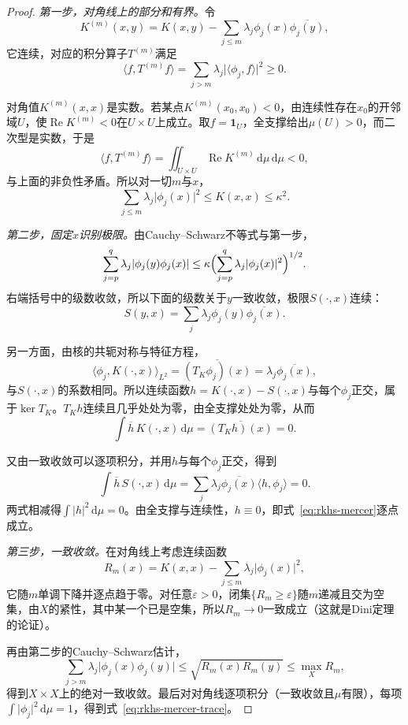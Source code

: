 \begin{proof}
\emph{第一步，对角线上的部分和有界。}令
\[
K^{(m)}(x,y)=K(x,y)-\sum_{j\leq m}\lambda_j\phi_j(x)\overline{\phi_j(y)} ,
\]
它连续，对应的积分算子$T^{(m)}$满足
\[
\langle f,T^{(m)}f\rangle=\sum_{j>m}\lambda_j\lvert\langle\phi_j,f\rangle\rvert^2\geq0 .
\]

对角值$K^{(m)}(x,x)$是实数。若某点$K^{(m)}(x_0,x_0)<0$，由连续性存在$x_0$的开邻域$U$，使$\operatorname{Re}K^{(m)}<0$在$U\times U$上成立。取$f=\mathbf 1_U$，全支撑给出$\mu(U)>0$，而二次型是实数，于是
\[
\langle f,T^{(m)}f\rangle=\iint_{U\times U}\operatorname{Re}K^{(m)}\,\mathrm d\mu\,\mathrm d\mu<0 ,
\]
与上面的非负性矛盾。所以对一切$m$与$x$，
\[
\sum_{j\leq m}\lambda_j\lvert\phi_j(x)\rvert^2\leq K(x,x)\leq\kappa^2 .
\]

\emph{第二步，固定$x$识别极限。}由Cauchy--Schwarz不等式与第一步，
\[
\sum_{j=p}^q\lambda_j\lvert\phi_j(y)\phi_j(x)\rvert\leq\kappa\Bigl(\sum_{j=p}^q\lambda_j\lvert\phi_j(x)\rvert^2\Bigr)^{1/2} .
\]
右端括号中的级数收敛，所以下面的级数关于$y$一致收敛，极限$S(\cdot,x)$连续：
\[
S(y,x)=\sum_j\lambda_j\phi_j(y)\overline{\phi_j(x)} .
\]

另一方面，由核的共轭对称与特征方程，
\[
\langle\phi_j,K(\cdot,x)\rangle_{L^2}=\overline{(T_K\phi_j)(x)}=\lambda_j\overline{\phi_j(x)} ,
\]
与$S(\cdot,x)$的系数相同。所以连续函数$h=K(\cdot,x)-S(\cdot,x)$与每个$\phi_j$正交，属于$\ker T_K$。$T_Kh$连续且几乎处处为零，由全支撑处处为零，从而
\[
\int\overline h\,K(\cdot,x)\,\mathrm d\mu=\overline{(T_Kh)(x)}=0 .
\]

又由一致收敛可以逐项积分，并用$h$与每个$\phi_j$正交，得到
\[
\int\overline h\,S(\cdot,x)\,\mathrm d\mu=\sum_j\lambda_j\overline{\phi_j(x)}\langle h,\phi_j\rangle=0 .
\]
两式相减得$\int\lvert h\rvert^2\,\mathrm d\mu=0$。由全支撑与连续性，$h\equiv0$，即式~\eqref{eq:rkhs-mercer}逐点成立。

\emph{第三步，一致收敛。}在对角线上考虑连续函数
\[
R_m(x)=K(x,x)-\sum_{j\leq m}\lambda_j\lvert\phi_j(x)\rvert^2 ,
\]
它随$m$单调下降并逐点趋于零。对任意$\varepsilon>0$，闭集$\{R_m\geq\varepsilon\}$随$m$递减且交为空集，由$X$的紧性，其中某一个已是空集，所以$R_m\to0$一致成立（这就是Dini定理的论证）。

再由第二步的Cauchy--Schwarz估计，
\[
\sum_{j>m}\lambda_j\lvert\phi_j(x)\phi_j(y)\rvert\leq\sqrt{R_m(x)R_m(y)}\leq\max_XR_m ,
\]
得到$X\times X$上的绝对一致收敛。最后对对角线逐项积分（一致收敛且$\mu$有限），每项$\int\lvert\phi_j\rvert^2\,\mathrm d\mu=1$，得到式~\eqref{eq:rkhs-mercer-trace}。
\end{proof}

